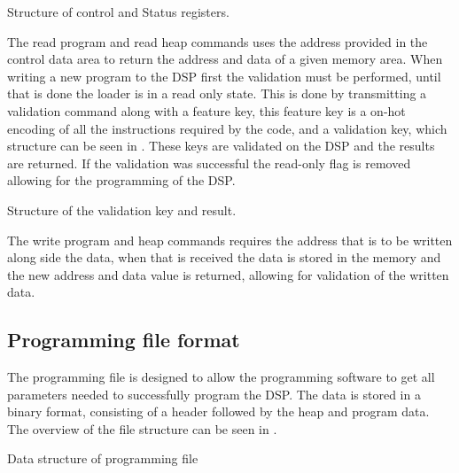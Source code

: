 \begin{table}[H]
	\centering
		
		\caption{Structure of control and Status registers.}
		\label{tab:controlregisters}
\end{table}

The read program and read heap commands uses the address provided in the control data area to return the address and data of a given memory area.
When writing a new program to the DSP first the validation must be performed, until that is done the loader is in a read only state. This is done by transmitting a validation command along with a feature key, this feature key is a on-hot encoding of all the instructions required by the code, and a validation key, which structure can be seen in . These keys are validated on the DSP and the results are returned. If the validation was successful the read-only flag is removed allowing for the programming of the DSP.

\begin{table}[H]
	\centering
		
		\caption{Structure of the validation key and result.}
		\label{tab:validationkey}
\end{table}

The write program and heap commands requires the address that is to be written along side the data, when that is received the data is stored in the memory and the new address and data value is returned, allowing for validation of the written data.

\subsection{Programming file format}
\label{sec:design:binaryfile}
The programming file is designed to allow the programming software to get all parameters needed to successfully program the DSP. The data is stored in a binary format, consisting of a header followed  by the heap and program data. The overview of the file structure can be seen in . 

\begin{table}[H]
	\centering
		
		\caption{Data structure of programming file}
		\label{tab:binfile}
\end{table}
